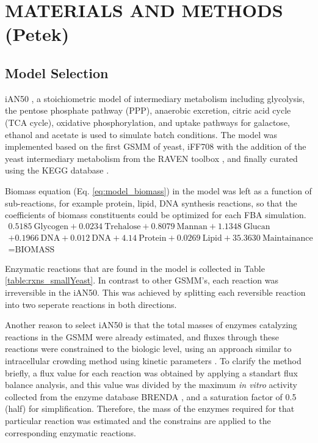 \chapter{MATERIALS AND METHODS (Petek)}

\section{Model Selection}
iAN50 \cite{nilsson2016metabolic}, a stoichiometric model of intermediary metabolism including glycolysis, the pentose phosphate pathway (PPP), anaerobic excretion, citric acid cycle (TCA cycle), oxidative phosphorylation, and uptake pathways for galactose, ethanol and acetate is used to simulate batch conditions. The model was implemented based on the first GSMM of yeast, iFF708 \cite{forster2003genome} with the addition of the yeast intermediary metabolism from the RAVEN toolbox \cite{agren2013raven}, and finally curated using the KEGG database \cite{kanehisa2000kegg}.

Biomass equation (Eq. \ref{eq:model_biomass}) in the model was left as a function of sub-reactions, for example protein, lipid, DNA synthesis reactions, so that the coefficients of biomass constituents could be optimized for each FBA simulation.
\begin{multline}
  0.5185\ \textrm{Glycogen} + 0.0234\ \textrm{Trehalose} + 0.8079\ \textrm{Mannan} + 1.1348\ \textrm{Glucan} \\
  + 0.1966\ \textrm{DNA} + 0.012\ \textrm{DNA} +  4.14\ \textrm{Protein} + 0.0269\ \textrm{Lipid} + 35.3630 \ \textrm{Maintainance} \\
  = \textrm{BIOMASS}
   \label{eq:model_biomass}
\end{multline}

Enzymatic reactions that are found in the model is collected in Table \ref{table:rxns_smallYeast}. In contrast to other GSMM's, each reaction was irreversible in the iAN50. This was achieved by splitting each reversible reaction into two seperate reactions in both directions.

Another reason to select iAN50 is that the total masses of enzymes catalyzing reactions in the GSMM were already estimated, and fluxes through these reactions were constrained to the biologic level, using an approach similar to intracellular crowding method using kinetic parameters \cite{beg2007intracellular, adadi2012prediction}. To clarify the method briefly, a flux value for each reaction was obtained by applying a standart flux balance analysis, and this value was divided by the maximum \emph{in vitro} activity collected from the enzyme database BRENDA \cite{schomburg2012brenda}, and a saturation factor of 0.5 (half) for simplification. Therefore, the mass of the enzymes required for that particular reaction was estimated and the constrains are applied to the corresponding enzymatic reactions.

